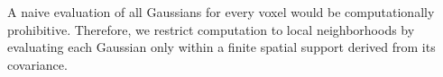 \documentclass[runningheads]{llncs}
\begin{document}



A naive evaluation of all Gaussians for every voxel would be computationally prohibitive. Therefore, we restrict computation to local neighborhoods by evaluating each Gaussian only within a finite spatial support derived from its covariance. %




\end{document}
